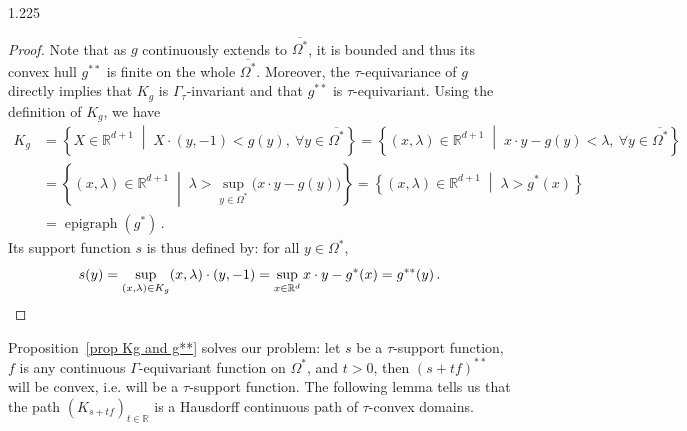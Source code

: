 \documentclass[reqno, a4paper]{amsart}
\numberwithin{equation}{section}
\numberwithin{figure}{section}
\theoremstyle{definition}
\theoremstyle{remark}
\newcommand{\R}{\mathbb{R}} %
\DeclareMathOperator{\epi}{epigraph} %
\newcommand{\st}{\; \middle\vert \;} %
\newcommand{\bp}[1]{{\bigl( {#1} \bigr)}} %
\begin{document}
\begin{spacing}{1.225}
\begin{proof}
Note that as $g$ continuously extends to $\overline{\Omega^*}$, it is bounded and thus its convex hull $g^{**}$ is finite on the whole $\overline{\Omega^*}$. Moreover, the $\tau$-equivariance of $g$ directly implies that $K_g$ is $\Gamma_\tau$-invariant and that $g^{**}$ is $\tau$-equivariant. Using the definition of $K_g$, we have 
\begin{align*}
 K_g & = \left\lbrace X \in \R^{d+1} \st X\cdot(y,-1)<g(y), \ \forall y \in \overline{\Omega^*}\right\rbrace = \left\lbrace (x,\lambda) \in \R^{d+1} \st x\cdot y - g(y) < \lambda, \ \forall y \in \overline{\Omega^*}\right\rbrace \\
 & = \left\lbrace (x,\lambda) \in \R^{d+1} \st \lambda > \sup_{y \in \Omega^*}\bp{x\cdot y -g(y)}\right\rbrace = \left\lbrace (x,\lambda) \in \R^{d+1} \st \lambda > g^*(x)\right\rbrace \\
 & = \epi (g^*) \, . 
\end{align*}
Its support function $s$ is thus defined by: for all $y \in \Omega^*$,
\begin{equation*}
s(y) = \sup_{(x, \lambda) \in K_g} (x,\lambda) \cdot (y,-1) = \sup_{x \in \R^d } x\cdot y -g^*(x)
 = g^{**}(y) \, . \qedhere
\end{equation*}
\end{proof} 

Proposition~\ref{prop Kg and g**} solves our problem: let $s$ be a $\tau$-support function, $f$ is any continuous $\Gamma$-equivariant function on $\Omega^*$, and $t>0$, then $(s+tf)^{**}$ will be convex, i.e. will be a $\tau$-support function. The following lemma tells us that the path $(K_{s+tf})_{t \in \R}$ is a Hausdorff continuous path of $\tau$-convex domains.


\end{spacing}
\end{document}
